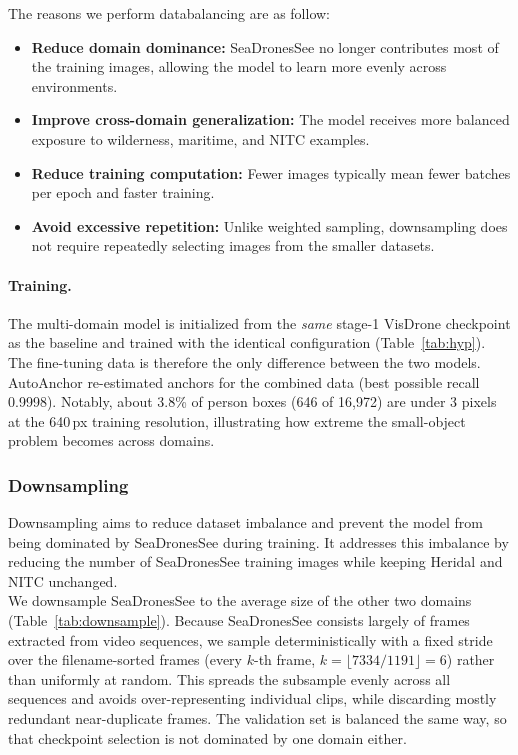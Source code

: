 \documentclass{article}
\begin{document}
The reasons we perform databalancing are as follow:
\begin{itemize}
    \item \textbf{Reduce domain dominance:} SeaDronesSee no longer contributes most of the training images, allowing the model to learn more evenly across environments.
    \item \textbf{Improve cross-domain generalization:} The model receives more balanced exposure to wilderness, maritime, and NITC examples.
    \item \textbf{Reduce training computation:} Fewer images typically mean fewer batches per epoch and faster training.
    \item \textbf{Avoid excessive repetition:} Unlike weighted sampling, downsampling does not require repeatedly selecting images from the smaller datasets.\\
\end{itemize}

\paragraph{Training.} The multi-domain model is initialized from the \emph{same} stage-1 VisDrone checkpoint as the baseline and trained with the identical configuration (Table~\ref{tab:hyp}). The fine-tuning data is therefore the only difference between the two models. AutoAnchor re-estimated anchors for the combined data (best possible recall 0.9998). Notably, about 3.8\% of person boxes (646 of 16,972) are under 3 pixels at the 640\,px training resolution, illustrating how extreme the small-object problem becomes across domains.

\subsubsection{Downsampling}
Downsampling aims to reduce dataset imbalance and prevent the model from being dominated by SeaDronesSee during training. It addresses this imbalance by reducing the number of SeaDronesSee training images while keeping Heridal and NITC unchanged.\\

We downsample SeaDronesSee to the average size of the other two domains (Table~\ref{tab:downsample}). Because SeaDronesSee consists largely of frames extracted from video sequences, we sample deterministically with a fixed stride over the filename-sorted frames (every $k$-th frame, $k=\lfloor 7334/1191 \rfloor = 6$) rather than uniformly at random. This spreads the subsample evenly across all sequences and avoids over-representing individual clips, while discarding mostly redundant near-duplicate frames. The validation set is balanced the same way, so that checkpoint selection is not dominated by one domain either.\\
\end{document}
